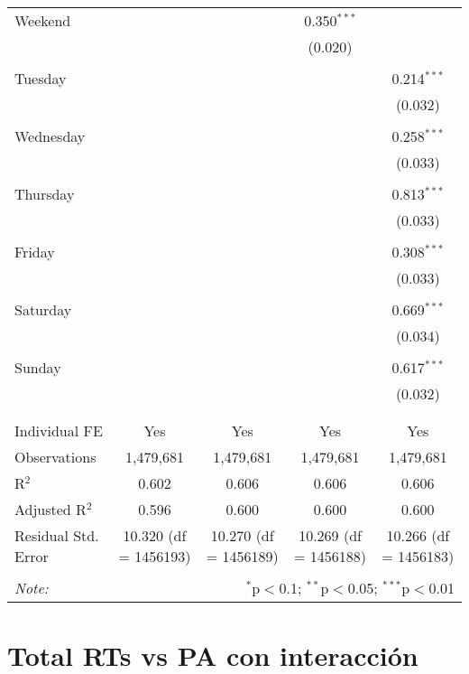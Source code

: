 \documentclass[
]{article}
\begin{document}
\begin{table}[!htbp]
{\begin{tabular}{@{\extracolsep{5pt}}lcccc}
 Weekend &  &  & 0.350$^{***}$ &  \\ 
  &  &  & (0.020) &  \\ 
  & & & & \\ 
 Tuesday &  &  &  & 0.214$^{***}$ \\ 
  &  &  &  & (0.032) \\ 
  & & & & \\ 
 Wednesday &  &  &  & 0.258$^{***}$ \\ 
  &  &  &  & (0.033) \\ 
  & & & & \\ 
 Thursday &  &  &  & 0.813$^{***}$ \\ 
  &  &  &  & (0.033) \\ 
  & & & & \\ 
 Friday &  &  &  & 0.308$^{***}$ \\ 
  &  &  &  & (0.033) \\ 
  & & & & \\ 
 Saturday &  &  &  & 0.669$^{***}$ \\ 
  &  &  &  & (0.034) \\ 
  & & & & \\ 
 Sunday &  &  &  & 0.617$^{***}$ \\ 
  &  &  &  & (0.032) \\ 
  & & & & \\ 
\hline \\[-1.8ex] 
Individual FE & Yes & Yes & Yes & Yes \\ 
Observations & 1,479,681 & 1,479,681 & 1,479,681 & 1,479,681 \\ 
R$^{2}$ & 0.602 & 0.606 & 0.606 & 0.606 \\ 
Adjusted R$^{2}$ & 0.596 & 0.600 & 0.600 & 0.600 \\ 
Residual Std. Error & 10.320 (df = 1456193) & 10.270 (df = 1456189) & 10.269 (df = 1456188) & 10.266 (df = 1456183) \\ 
\hline 
\hline \\[-1.8ex] 
\textit{Note:}  & \multicolumn{4}{r}{$^{*}$p$<$0.1; $^{**}$p$<$0.05; $^{***}$p$<$0.01} \\ 
\end{tabular}
} 
\end{table} 
\newpage
\section{Total RTs vs PA con interacción}
\end{document}
